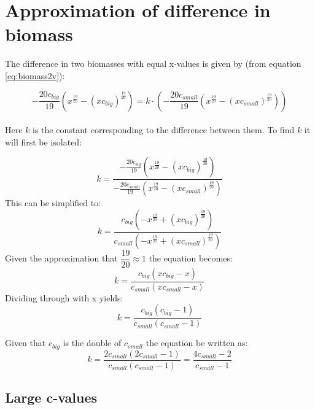 \documentclass{article}
\numberwithin{equation}{section} %
\begin{document}
\newpage

\section{Approximation of difference in biomass}\label{a:biomassDifApprox}
The difference in two biomasses with equal x-values is given by (from equation \ref{eq:biomass2v}): 

\begin{equation}
	 -{\frac {20c_{big}}{19} \left( {x}^{{\frac{19}{20}}}- \left( xc_{big} \right) ^{{\frac{19}{20}}} \right) } = k\cdot \left(-{\frac {20c_{small}}{19} \left( {x}^{{\frac{19}{20}}}- \left( xc_{small} \right) ^{{\frac{19}{20}}} \right) }\right) 
\end{equation}\\
Here $k$ is the constant corresponding to the difference between them. To find $k$ it will first be isolated:

\begin{equation}
	k = \dfrac{-{\frac {20c_{big}}{19} \left( {x}^{{\frac{19}{20}}}- \left( xc_{big} \right) ^{{\frac{19}{20}}} \right) }}{-{\frac {20c_{small}}{19} \left( {x}^{{\frac{19}{20}}}- \left( xc_{small} \right) ^{{\frac{19}{20}}} \right) }}
\end{equation}
This can be simplified to:
\begin{equation}
	k = \dfrac{c_{big}\left(-{x}^{{\frac{19}{20}}}+\left( xc_{big} \right) ^{{\frac{19}{20}}} \right) }{c_{small} \left(- {x}^{{\frac{19}{20}}}+\left( xc_{small} \right) ^{{\frac{19}{20}}} \right)}
\end{equation}
Given the approximation that $\dfrac{19}{20} \approx 1$ the equation becomes:
\begin{equation}
	k = \dfrac{c_{big}\left(xc_{big}-x\right) }{c_{small} \left( xc_{small}-x\right)}
\end{equation}
Dividing through with x yields:
\begin{equation}\label{eq:a:2:kapproxSmall}
	k = \dfrac{c_{big}\left( c_{big}-1\right) }{c_{small} \left( c_{small}-1\right)}
\end{equation}

Given that $c_{big}$ is the double of $c_{small}$ the equation be written as:
\begin{equation}\label{eq:a:2:kapproxDoubleSmall}
	k = \dfrac{2c_{small}\left(2c_{small}-1\right) }{c_{small} \left( c_{small}-1\right)} = \dfrac{4c_{small}-2}{c_{small}-1}
\end{equation}
\subsection{Large c-values}\label{a:sub:largeCvalues}
\end{document}
